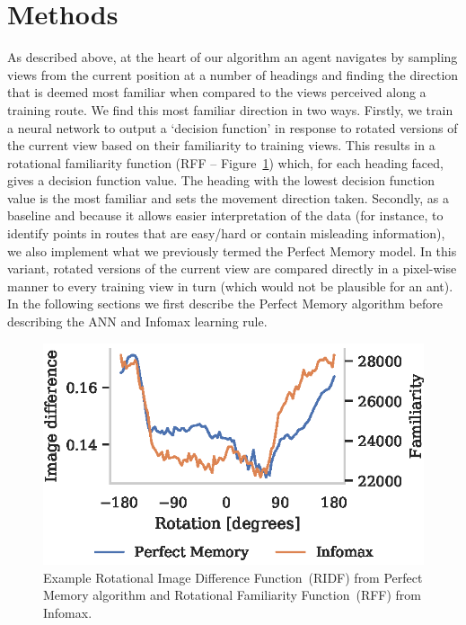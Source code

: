 \documentclass[letterpaper]{article}
\begin{document}
\section{Methods}
As described above, at the heart of our algorithm an agent navigates by sampling views from the current position at a number of headings and finding the direction that is deemed most familiar when compared to the views perceived along a training route. 
We find this most familiar direction in two ways. 
Firstly, we train a neural network to output a `decision function' in response to rotated versions of the current view based on their familiarity to training views.
This results in a rotational familiarity function (RFF -- Figure~\ref{fig:good_ridf}) which, for each heading faced, gives a decision function value.
The heading with the lowest decision function value is the most familiar and sets the movement direction taken.
Secondly, as a baseline and because it allows easier interpretation of the data (for instance, to identify points in routes that are easy/hard or contain misleading information), we also implement what we previously termed the Perfect Memory model. 
In this variant, rotated versions of the current view are compared directly in a pixel-wise manner to every training view in turn (which would not be plausible for an ant). 
In the following sections we first describe the Perfect Memory algorithm before describing the ANN and Infomax learning rule.

\begin{figure}[t]
    \centering
    \includegraphics{figures/good_ridf.eps}
    \caption{Example Rotational Image Difference Function~(RIDF) from Perfect Memory algorithm and Rotational Familiarity Function~(RFF) from Infomax.}
    \label{fig:good_ridf}
\end{figure}
\end{document}
